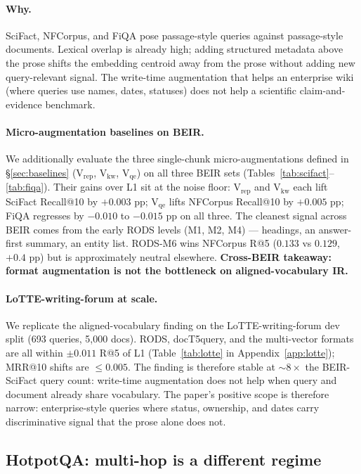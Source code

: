 \documentclass[11pt]{article}
\begin{document}
\paragraph{Why.}
SciFact, NFCorpus, and FiQA pose passage-style queries against
passage-style documents. Lexical overlap is already high; adding
structured metadata above the prose shifts the embedding centroid
away from the prose without adding new query-relevant signal. The
write-time augmentation that helps an enterprise wiki (where queries
use names, dates, statuses) does not help a scientific claim-and-evidence
benchmark.

\paragraph{Micro-augmentation baselines on BEIR.} We additionally
evaluate the three single-chunk micro-augmentations defined in
\S\ref{sec:baselines} (V$_{\text{rep}}$, V$_{\text{kw}}$,
V$_{\text{qe}}$) on all three BEIR sets
(Tables~\ref{tab:scifact}--\ref{tab:fiqa}). Their gains over L1 sit at
the noise floor: V$_{\text{rep}}$ and V$_{\text{kw}}$ each lift
SciFact Recall@10 by $+0.003$ pp; V$_{\text{qe}}$ lifts NFCorpus
Recall@10 by $+0.005$ pp; FiQA regresses by $-0.010$ to $-0.015$ pp
on all three. The cleanest signal across BEIR comes from the early
RODS levels (M1, M2, M4) --- headings, an answer-first summary, an
entity list. RODS-M6 wins NFCorpus R@5 ($0.133$ vs $0.129$, $+0.4$
pp) but is approximately neutral elsewhere. \textbf{Cross-BEIR
takeaway: format augmentation is not the bottleneck on
aligned-vocabulary IR.}

\paragraph{LoTTE-writing-forum at scale.} We replicate the
aligned-vocabulary finding on the LoTTE-writing-forum dev split
(693 queries, 5{,}000 docs). RODS, docT5query, and the multi-vector
formats are all within $\pm 0.011$ R@5 of L1 (Table~\ref{tab:lotte}
in Appendix~\ref{app:lotte}); MRR@10 shifts are $\leq 0.005$. The
finding is therefore stable at $\sim 8\times$ the BEIR-SciFact query
count: write-time augmentation does not help when query and document
already share vocabulary. The paper's positive scope is therefore
narrow: enterprise-style queries where status, ownership, and dates
carry discriminative signal that the prose alone does not.

\subsection{HotpotQA: multi-hop is a different regime}
\label{sec:hotpot}
\end{document}
